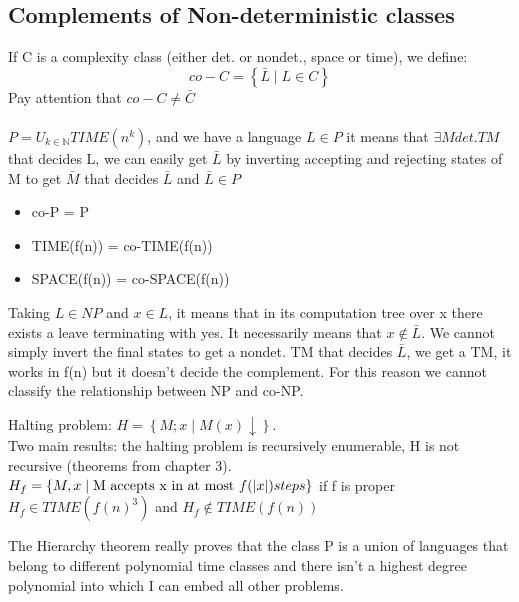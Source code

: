 \subsection{Complements of Non-deterministic classes}
If C is a complexity class (either det. or nondet., space or time), we define:
\[ 
    co-C = \left\{ \bar{L} \mid L \in C \right\} 
\]Pay attention that $co-C \neq \bar{C}$\\\\
$P = U_{k\in\mathbb{N}}TIME(n^k)$, and we have a language $L \in P$ it means that $\exists M det. TM$ that decides L, we can easily get $\bar{L}$ by inverting accepting and rejecting states of M to get $\bar{M}$ that decides $\bar{L}$ and $\bar{L} \in P$
\begin{itemize}
    \item co-P = P
    \item TIME(f(n)) = co-TIME(f(n))
    \item SPACE(f(n)) = co-SPACE(f(n))
\end{itemize}
Taking $L \in NP$ and $x \in L$, it means that in its computation tree over x there exists a leave terminating with yes. It necessarily means that $x\notin \bar{L}$. We cannot simply invert the final states to get a nondet. TM that decides $\bar{L}$, we get a TM, it works in f(n) but it doesn't decide the complement. For this reason we cannot classify the relationship between NP and co-NP.
\begin{theorem}
    Halting problem: $H = \left\{ M;x \mid M(x) \downarrow \right\}$.\\ Two main results: the halting problem is recursively enumerable, H is not recursive (theorems from chapter 3). \\
    $H_f = \left\{ M,x \mid \text{M accepts x in at most } f(\left\lvert x\right\rvert) steps \right\}$ if f is proper $H_f \in TIME(f(n)^3)$ and $H_f\notin TIME(f(n))$
\end{theorem}
The Hierarchy theorem really proves that the class P is a union of languages that belong to different polynomial time classes and there isn't a highest degree polynomial into which I can embed all other problems.
